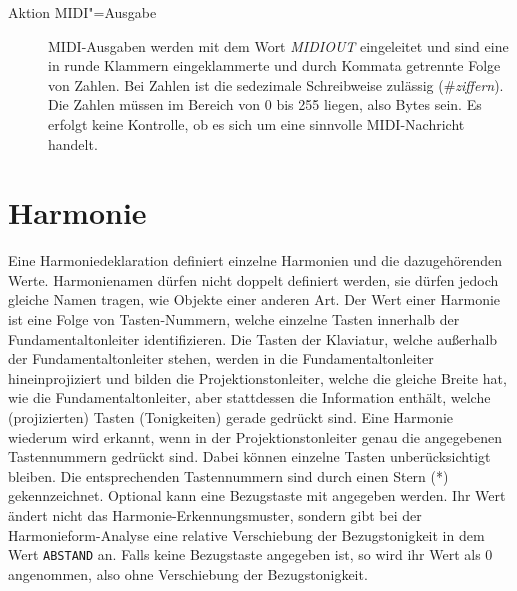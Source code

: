 \begin{description}
      

      \item[Aktion MIDI"=Ausgabe]
	MIDI-Ausgaben werden mit dem Wort \emph{MIDIOUT}
	 eingeleitet und
sind eine in runde Klammern eingeklammerte
und durch Kommata getrennte Folge von Zahlen. Bei Zahlen ist die sedezimale
Schreibweise zulässig (\#\emph{ziffern}).\index{\#} Die Zahlen
müssen im Bereich von 0 bis 255 liegen, also Bytes sein. Es erfolgt keine
Kontrolle, ob es sich um eine sinnvolle MIDI-Nachricht handelt.

      

\end{description}

\chapter{Harmonie}\label{cha:harmonie}

Eine Harmoniedeklaration definiert einzelne Harmonien und die
dazugehörenden Werte. Harmonienamen dürfen nicht doppelt definiert
werden, sie dürfen jedoch gleiche Namen tragen,
wie Objekte einer anderen Art.
Der Wert einer Harmonie ist eine Folge von Tasten-Nummern,
welche einzelne Tasten innerhalb der Fundamentaltonleiter identifizieren.
Die Tasten der Klaviatur, welche außerhalb der Fundamentaltonleiter
stehen, werden in die Fundamentaltonleiter hineinprojiziert und
bilden die Projektionstonleiter,
welche die gleiche Breite
hat, wie die Fundamentaltonleiter, aber stattdessen die Information
enthält, welche (projizierten) Tasten (Tonigkeiten)
gerade gedrückt sind.
Eine Harmonie wiederum wird erkannt, wenn in der Projektionstonleiter genau
die angegebenen Tastennummern gedrückt sind. Dabei können einzelne
Tasten unberücksichtigt bleiben. Die entsprechenden Tastennummern sind
durch einen Stern (*)\index{*} gekennzeichnet.
Optional kann eine Bezugstaste
mit angegeben werden.
Ihr Wert ändert nicht das Harmonie-Erkennungsmuster, sondern gibt
bei der Harmonieform-Analyse eine relative Verschiebung
der Bezugstonigkeit
 in dem Wert \texttt{ABSTAND} an.
Falls keine Bezugstaste angegeben ist, so wird ihr Wert als $0$ angenommen,
also ohne Verschiebung der Bezugstonigkeit.





